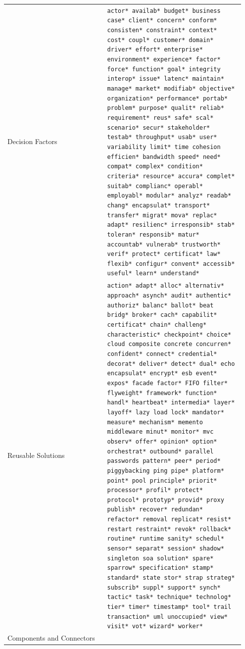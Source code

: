 \documentclass[a4paper, 12pt]{article}
\begin{document}
		\begin{table}[H]
			\begin{tabular}{p{0.4\linewidth} p{0.55\linewidth}}
				Decision Factors &
				\tiny
				\texttt{actor* availab* budget* business case* client* concern* conform* consisten* constraint* context* cost* coupl* customer* domain* driver* effort* enterprise* environment* experience* factor* force* function* goal* integrity interop* issue* latenc* maintain* manage* market* modifiab* objective* organization* performance* portab* problem* purpose* qualit* reliab* requirement* reus* safe* scal* scenario* secur* stakeholder* testab* throughput* usab* user* variability limit* time cohesion efficien* bandwidth speed* need* compat* complex* condition* criteria* resource* accura* complet* suitab* complianc* operabl* employabl* modular* analyz* readab* chang* encapsulat* transport* transfer* migrat* mova* replac* adapt* resilienc* irresponsib* stab* toleran* responsib* matur* accountab* vulnerab* trustworth* verif* protect* certificat* law* flexib* configur* convent* accessib* useful* learn* understand*}
				\\
				Reusable Solutions &
				\tiny
				\texttt{action* adapt* alloc* alternativ* approach* asynch* audit* authentic* authoriz* balanc* ballot* beat bridg* broker* cach* capabilit* certificat* chain* challeng* characteristic* checkpoint* choice* cloud composite concrete concurren* confident* connect* credential* decorat* deliver* detect* dual* echo encapsulat* encrypt* esb event* expos* facade factor* FIFO filter* flyweight* framework* function* handl* heartbeat* intermedia* layer* layoff* lazy load lock* mandator* measure* mechanism* memento middleware minut* monitor* mvc observ* offer* opinion* option* orchestrat* outbound* parallel passwords pattern* peer* period* piggybacking ping pipe* platform* point* pool principle* priorit* processor* profil* protect* protocol* prototyp* provid* proxy publish* recover* redundan* refactor* removal replicat* resist* restart restraint* revok* rollback* routine* runtime sanity* schedul* sensor* separat* session* shadow* singleton soa solution* spare* sparrow* specification* stamp* standard* state stor* strap strateg* subscrib* suppl* support* synch* tactic* task* technique* technolog* tier* timer* timestamp* tool* trail transaction* uml unoccupied* view* visit* vot* wizard* worker*}
				\\
				Components and Connectors &
				\tiny

\end{tabular}
\end{table}
\end{document}
